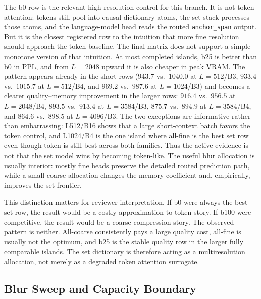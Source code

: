\documentclass{article}
\theoremstyle{plain}
\theoremstyle{definition}
\theoremstyle{remark}
\begin{document}
The b0 row is the relevant high-resolution control for this branch.  It is not
token attention: tokens still pool into causal dictionary atoms, the set stack
processes those atoms, and the language-model head reads the routed
\texttt{anchor\_span} output.  But it is the closest registered row to the
intuition that more fine resolution should approach the token baseline.  The
final matrix does not support a simple monotone version of that intuition.  At
most completed islands, b25 is better than b0 in PPL, and from $L=2048$
upward it is also cheaper in peak VRAM.  The pattern appears already in the
short rows ($943.7$ vs.\ $1040.0$ at $L=512$/B3, $933.4$ vs.\ $1015.7$ at
$L=512$/B4, and $969.2$ vs.\ $987.6$ at $L=1024$/B3) and becomes a clearer
quality--memory improvement in the larger rows: $916.4$ vs.\ $956.5$ at
$L=2048$/B4, $893.5$ vs.\ $913.4$ at $L=3584$/B3, $875.7$ vs.\ $894.9$ at
$L=3584$/B4, and $864.6$ vs.\ $898.5$ at $L=4096$/B3.  The two exceptions are
informative rather than embarrassing: L512/B16 shows that a large short-context
batch favors the token control, and L1024/B4 is the one island where all-fine
is the best set row even though token is still best across both families.  Thus the active
evidence is not that the set model wins by becoming token-like.  The useful
blur allocation is usually interior: mostly fine heads preserve the detailed
routed prediction path, while a small coarse allocation changes the memory
coefficient and, empirically, improves the set frontier.

This distinction matters for reviewer interpretation.  If b0 were always the
best set row, the result would be a costly approximation-to-token story.  If
b100 were competitive, the result would be a coarse-compression story.  The
observed pattern is neither.  All-coarse consistently pays a large quality
cost, all-fine is usually not the optimum, and b25 is the stable quality row
in the larger fully comparable islands.  The set dictionary is therefore acting as a
multiresolution allocation, not merely as a degraded token attention surrogate.

\subsection{Blur Sweep and Capacity Boundary}
\label{sec:results-blur-capacity}
\end{document}
